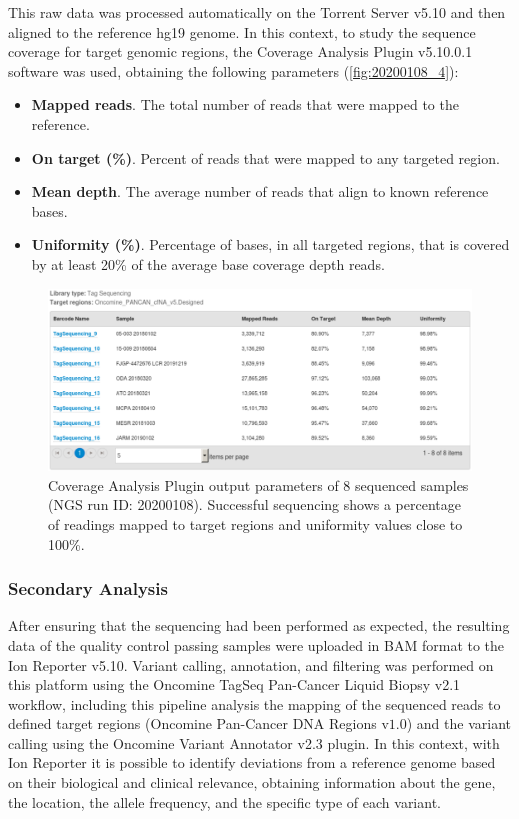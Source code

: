 This raw data was processed automatically on the Torrent Server\texttrademark{} v5.10 and then aligned to the reference hg19 genome. In this context, to study the sequence coverage for target genomic regions, the  Coverage Analysis Plugin v5.10.0.1 software was used, obtaining the following parameters (\autoref{fig:20200108_4}):
\begin{itemize}
    \item \textbf{Mapped reads}. The total number of reads that were mapped to the reference.
    \item \textbf{On target (\%)}. Percent of reads that were mapped to any targeted region.
    \item \textbf{Mean depth}. The average number of reads that align to known reference bases.
    \item \textbf{Uniformity (\%)}. Percentage of bases, in all targeted regions, that is covered by at least 20\% of the average base coverage depth reads.
\end{itemize}

\begin{figure}[ht]
    \centering
    \includegraphics[width=\textwidth]{Images/chapter_3/20200108/20200108_4.png}
    \caption{Coverage Analysis Plugin output parameters of 8 sequenced samples (NGS run ID: 20200108). Successful sequencing shows a percentage of readings mapped to target regions and uniformity values close to 100\%.}
    \label{fig:20200108_4}
\end{figure}

\subsubsection{Secondary Analysis}

After ensuring that the sequencing had been performed as expected, the resulting data of the quality control passing samples were uploaded in BAM format to the Ion Reporter\texttrademark{} v5.10. Variant calling, annotation, and filtering was performed on this platform using the Oncomine\texttrademark{} TagSeq Pan-Cancer Liquid Biopsy v2.1 workflow, including this pipeline analysis the mapping of the sequenced reads to defined target regions (Oncomine\texttrademark{} Pan-Cancer DNA Regions v$1.0$) and the variant calling using the Oncomine\texttrademark{} Variant Annotator v2.3 plugin. In this context, with Ion Reporter\texttrademark{} it is possible to identify deviations from a reference genome based on their biological and clinical relevance, obtaining information about the gene, the location, the allele frequency, and the specific type of each variant.

